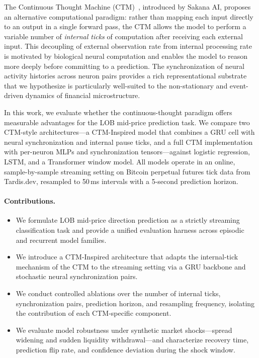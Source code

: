 \documentclass[11pt]{article}
\begin{document}
The Continuous Thought Machine (CTM)~\citep{sakana2025ctm}, introduced by
Sakana AI, proposes an alternative computational paradigm: rather than mapping
each input directly to an output in a single forward pass, the CTM allows the
model to perform a variable number of \emph{internal ticks} of computation
after receiving each external input. This decoupling of external observation
rate from internal processing rate is motivated by biological neural computation
and enables the model to reason more deeply before committing to a prediction.
The synchronization of neural activity histories across neuron pairs provides a
rich representational substrate that we hypothesize is particularly well-suited
to the non-stationary and event-driven dynamics of financial microstructure.

In this work, we evaluate whether the continuous-thought paradigm offers
measurable advantages for the LOB mid-price prediction task. We compare two
CTM-style architectures---a CTM-Inspired model that combines a GRU cell with
neural synchronization and internal pause ticks, and a full CTM implementation
with per-neuron MLPs and synchronization tensors---against logistic regression,
LSTM, and a Transformer window model. All models operate in an online,
sample-by-sample streaming setting on Bitcoin perpetual futures tick data from
Tardis.dev, resampled to 50\,ms intervals with a 5-second prediction horizon.

\paragraph{Contributions.}
\begin{itemize}
  \item We formulate LOB mid-price direction prediction as a strictly streaming
    classification task and provide a unified evaluation harness across
    episodic and recurrent model families.
  \item We introduce a CTM-Inspired architecture that adapts the internal-tick
    mechanism of the CTM to the streaming setting via a GRU backbone and
    stochastic neural synchronization pairs.
  \item We conduct controlled ablations over the number of internal ticks,
    synchronization pairs, prediction horizon, and resampling frequency,
    isolating the contribution of each CTM-specific component.
  \item We evaluate model robustness under synthetic market shocks---spread
    widening and sudden liquidity withdrawal---and characterize recovery time,
    prediction flip rate, and confidence deviation during the shock window.
\end{itemize}
\end{document}
